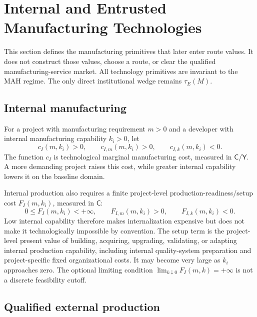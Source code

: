 \section{Internal and Entrusted Manufacturing Technologies}
\label{sec:p03-technologies}

This section defines the manufacturing primitives that later enter route
values. It does not construct those values, choose a route, or clear the
qualified manufacturing-service market. All technology primitives are
invariant to the MAH regime. The only direct institutional wedge remains
\(\tau_E(M)\).

\subsection{Internal manufacturing}
\label{subsec:p03-internal}

For a project with manufacturing requirement \(m>0\) and a developer with
internal manufacturing capability \(k_i>0\), let
\begin{equation}
  c_I(m,k_i)>0,
  \qquad
  c_{I,m}(m,k_i)>0,
  \qquad
  c_{I,k}(m,k_i)<0
  .
  \label{eq:p03-internal-cost}
\end{equation}
The function \(c_I\) is technological marginal manufacturing cost, measured
in \(\mathsf C/\mathsf Y\). A more demanding project raises this cost, while
greater internal capability lowers it on the baseline domain.

Internal production also requires a finite project-level
production-readiness/setup cost \(F_I(m,k_i)\), measured in \(\mathsf C\):
\begin{equation}
  0\leq F_I(m,k_i)<+\infty,
  \qquad
  F_{I,m}(m,k_i)>0,
  \qquad
  F_{I,k}(m,k_i)<0.
  \label{eq:p03-internal-setup}
\end{equation}
Low internal capability therefore makes internalization expensive but does
not make it technologically impossible by convention.
The setup term is the project-level present value of building, acquiring,
upgrading, validating, or adapting internal production capability, including
internal quality-system preparation and project-specific fixed
organizational costs. It may become very large as \(k_i\) approaches zero.
The optional limiting condition
\(\lim_{k\downarrow0}F_I(m,k)=+\infty\) is not a discrete feasibility cutoff.

\subsection{Qualified external production}
\label{subsec:p03-external}

